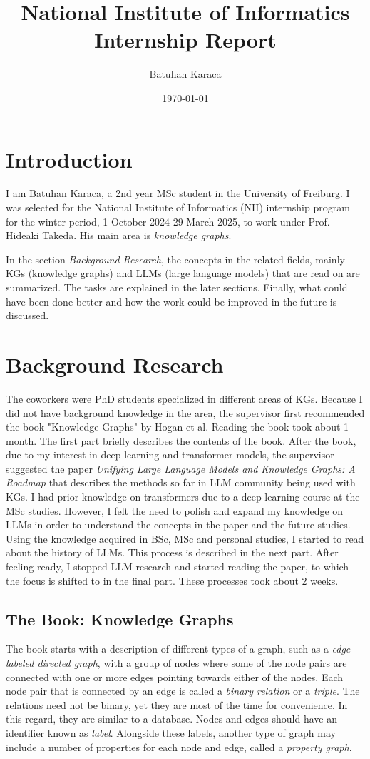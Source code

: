\documentclass{article}
\title{National Institute of Informatics Internship Report}
\author{Batuhan Karaca}
\date{\today}
\begin{document}
\maketitle
\tableofcontents

\section{Introduction}
I am Batuhan Karaca, a 2nd year MSc student in the University of Freiburg. I was selected for the National Institute of Informatics (NII) internship program for the winter period, 1 October 2024-29 March 2025, to work under Prof. Hideaki Takeda. His main area is \textit{knowledge graphs}.

In the section \textit{Background Research}, the concepts in the related fields, mainly KGs (knowledge graphs) and LLMs (large language models) that are read on are summarized. The tasks are explained in the later sections. Finally, what could have been done better and how the work could be improved in the future is discussed.
\section{Background Research}
The coworkers were PhD students specialized in different areas of KGs. Because I did not have background knowledge in the area, the supervisor first recommended the book "Knowledge Graphs" by Hogan et al. Reading the book took about 1 month. The first part briefly describes the contents of the book. After the book, due to my interest in deep learning and transformer models, the supervisor suggested the paper \textit{Unifying Large Language Models and Knowledge Graphs: A Roadmap} that describes the methods so far in LLM community being used with KGs. I had prior knowledge on transformers due to a deep learning course at the MSc studies. However, I felt the need to polish and expand my knowledge on LLMs in order to understand the concepts in the paper and the future studies. Using the knowledge acquired in BSc, MSc and personal studies, I started to read about the history of LLMs. This process is described in the next part. After feeling ready, I stopped LLM research and started reading the paper, to which the focus is shifted to in the final part. These processes took about 2 weeks.
\subsection{The Book: Knowledge Graphs}
The book starts with a description of different types of a graph, such as a \textit{edge-labeled directed graph}, with a group of nodes where some of the node pairs are connected with one or more edges pointing towards either of the nodes. Each node pair that is connected by an edge is called a \textit{binary relation} or a \textit{triple}. The relations need not be binary, yet they are most of the time for convenience. In this regard, they are similar to a database. Nodes and edges should have an identifier known as \textit{label}. Alongside these labels, another type of graph may include a number of properties for each node and edge, called a \textit{property graph}.
\end{document}
